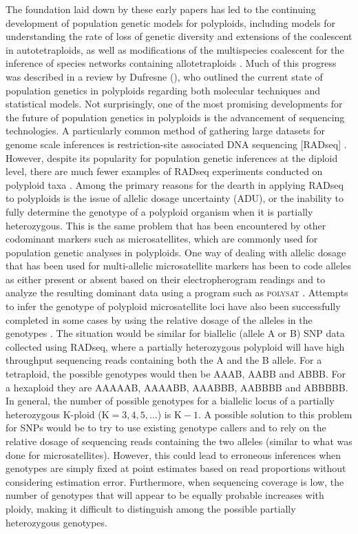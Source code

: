 \documentclass[11pt,english,letterpaper,oneside]{article}
\begin{document}
The foundation laid down by these early papers has led to the continuing development of population genetic models for polyploids, including models for understanding the rate of loss of genetic diversity and extensions of the coalescent in autotetraploids, as well as modifications of the multispecies coalescent for the inference of species networks containing allotetraploids \citep{moody1993autopolyploids,arnold2012autotetraploidCoal,jones2013allopolyploid}. Much of this progress was described in a review by Dufresne \etal{} (\citeyear{dufresne2014polyPopGen}), who outlined the current state of population genetics in polyploids regarding both molecular techniques and statistical models. Not surprisingly, one of the most promising developments for the future of population genetics in polyploids is the advancement of sequencing technologies. A particularly common method of gathering large datasets for genome scale inferences is restriction-site associated DNA sequencing [RADseq] \citep{miller2007gbs,baird2008radTags,puritz2014demystifyingRAD}. However, despite its popularity for population genetic inferences at the diploid level, there are much fewer examples of RADseq experiments conducted on polyploid taxa \citep[but see][]{ogden2013sturgeonRADseq,wang2013birchRADseq,logan-young2015polyploidSNP}. Among the primary reasons for the dearth in applying RADseq to polyploids is the issue of allelic dosage uncertainty (ADU), or the inability to fully determine the genotype of a polyploid organism when it is partially heterozygous. This is the same problem that has been encountered by other codominant markers such as microsatellites, which are commonly used for population genetic analyses in polyploids. One way of dealing with allelic dosage that has been used for multi-allelic microsatellite markers has been to code alleles as either present or absent based on their electropherogram readings and to analyze the resulting dominant data using a program such as \textsc{polysat} \citep{clark2007polysat,dufresne2014polyPopGen}. Attempts to infer the genotype of polyploid microsatellite loci have also been successfully completed in some cases by using the relative dosage of the alleles in the genotypes \citep{esselink2004polyploidSSR}. The situation would be similar for biallelic (allele A or B) SNP data collected using RADseq, where a partially heterozygous polyploid will have high throughput sequencing reads containing both the A and the B allele. For a tetraploid, the possible genotypes would then be AAAB, AABB and ABBB. For a hexaploid they are AAAAAB, AAAABB, AAABBB, AABBBB and ABBBBB. In general, the number of possible genotypes for a biallelic locus of a partially heterozygous K-ploid ($\text{K}=3,4,5,\ldots$) is $\text{K}-1$. A possible solution to this problem for SNPs would be to try to use existing genotype callers and to rely on the relative dosage of sequencing reads containing the two alleles (similar to what was done for microsatellites). However, this could lead to erroneous inferences when genotypes are simply fixed at point estimates based on read proportions without considering estimation error. Furthermore, when sequencing coverage is low, the number of genotypes that will appear to be equally probable increases with ploidy, making it difficult to distinguish among the possible partially heterozygous genotypes.
\end{document}
